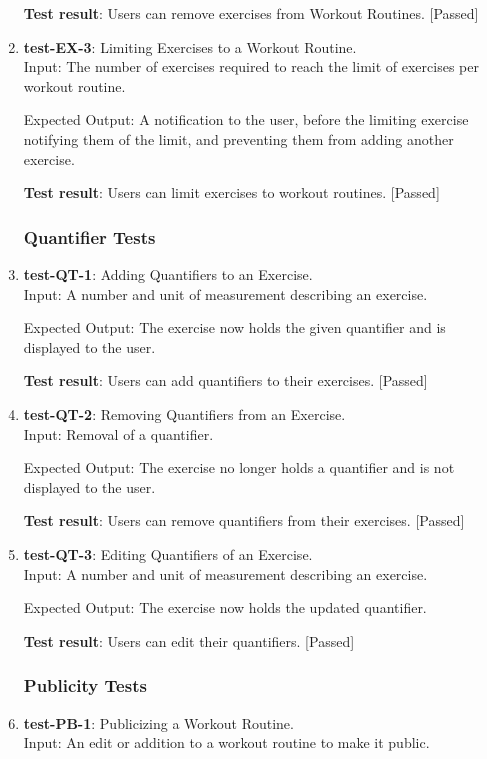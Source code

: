 \documentclass[12pt, titlepage]{article}
\begin{document}
\begin{enumerate}
    \textbf{Test result}: Users can remove exercises from Workout Routines. [Passed]
   
    \item{\textbf{test-EX-3}}: Limiting Exercises to a Workout Routine.\\
    Input: The number of exercises required to reach the limit of exercises per workout routine. 
	
    Expected Output: A notification to the user, before the limiting exercise notifying them of the limit, and preventing them from adding another exercise.
    
    \textbf{Test result}: Users can limit exercises to workout routines. [Passed]
   
\subsubsection{Quantifier Tests}
    \item{\textbf{test-QT-1}}: Adding Quantifiers to an Exercise.\\
    Input: A number and unit of measurement describing an exercise.
	
    Expected Output: The exercise now holds the given quantifier and is displayed to the user.
    
    \textbf{Test result}: Users can add quantifiers to their exercises. [Passed]
   
    \item{\textbf{test-QT-2}}: Removing Quantifiers from an Exercise.\\
    Input: Removal of a quantifier.
	
    Expected Output: The exercise no longer holds a quantifier and is not displayed to the user.
    
    \textbf{Test result}: Users can remove quantifiers from their exercises. [Passed]
   
    \item{\textbf{test-QT-3}}: Editing Quantifiers of an Exercise.\\
    Input: A number and unit of measurement describing an exercise.

    Expected Output: The exercise now holds the updated quantifier.
    
    \textbf{Test result}: Users can edit their quantifiers. [Passed]
   
\subsubsection{Publicity Tests}
    \item{\textbf{test-PB-1}}: Publicizing a Workout Routine.\\
    Input: An edit or addition to a workout routine to make it public.
	

\end{enumerate}
\end{document}
